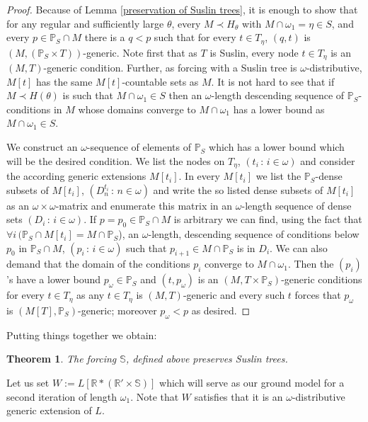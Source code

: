 \documentclass[a4paper,11pt]{article}
\newtheorem{theorem}{Theorem}[section]
\newcommand{\forceP}{\mathbb{P}}
\newcommand{\forceR}{\mathbb{R}}
\begin{document}
\begin{proof}
Because of Lemma \ref{preservation of Suslin trees}, it is enough to show that for any regular and sufficiently large
 $\theta$, every $M \prec H_{\theta}$ with $M \cap \omega_1 = \eta \in S$, and every
 $p \in \forceP_S \cap M$ there is a $q<p$ such that for every
 $t \in T_{\eta}$, $(q,t)$ is $(M,(\forceP_S \times T))$-generic.
 Note first that as $T$ is Suslin, every node $t \in T_{\eta}$ is an
 $(M,T)$-generic condition. Further, as forcing with a Suslin tree
 is $\omega$-distributive, $M[t]$ has the same $M[t]$-countable sets as $M$.
 It is not hard to see that if $M\prec H(\theta)$ is such
 that $M \cap \omega_1 \in S$ then an $\omega$-length descending sequence
 of $\forceP_S$-conditions in $M$ whose domains converge to $M \cap \omega_1$
 has a lower bound as $M \cap \omega_1 \in S$.
 
 We construct an $\omega$-sequence of elements of $\forceP_S$ which has a lower bound
 which will be the desired condition. 
 We list the nodes on $T_{\eta}$, $(t_i \, : \, i \in \omega)$ and
 consider the according generic extensions $M[t_i]$.
 In every $M[t_i]$ we list the $\forceP_S$-dense subsets of $M[t_i]$,
 $(D^{t_i}_n \, : \, n \in \omega)$ and write 
 the so listed dense subsets of $M[t_i]$ as an $\omega \times \omega$-matrix and enumerate
 this matrix in an $\omega$-length sequence of dense sets $(D_i \, : \, i \in \omega)$.
 If $p=p_0 \in \forceP_S \cap M$ is arbitrary we can find, using the fact that $\forall i \, (\forceP_S \cap M[t_i] = M \cap \forceP_S$), an $\omega$-length, descending
 sequence of conditions below $p_0$ in $\forceP_S \cap M$, $(p_i \, : \, i \in \omega)$
 such that $p_{i+1} \in M \cap \forceP_S$ is in $D_i$.
 We can also demand that the domain of the conditions $p_i$ converge to $M \cap \omega_1$.
 Then the $(p_i)$'s have a lower bound $p_{\omega} \in \forceP_S$ and $(t, p_{\omega})$ is an
 $(M, T \times \forceP_S)$-generic conditions for every $t \in T_{\eta}$ as any $t \in T_{\eta}$ is $(M,T)$-generic
 and every such $t$ forces that $p_{\omega}$ is $(M[T], \forceP_S)$-generic; moreover $p_{\omega} < p$ as 
 desired.
 \end{proof}
 
Putting things together we obtain:

\begin{theorem}
The forcing $\mathbb{S}$, defined above preserves Suslin trees.
\end{theorem}

Let us set $W:= L[\forceR \ast (\forceR' \times \mathbb{S}) ]$ which will serve as our ground model for a second iteration of length $\omega_1$. Note that $W$ satisfies that it is an $\omega$-distributive generic extension of $L$.
\end{document}
